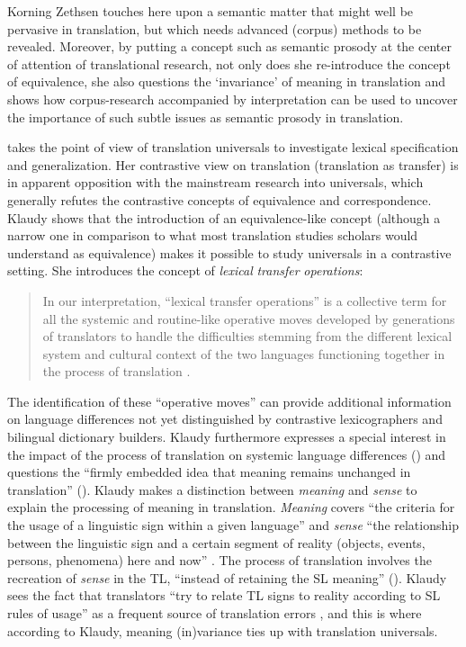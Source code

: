 Korning Zethsen touches here upon a semantic matter that might well be pervasive in translation, but which needs advanced (corpus) methods to be revealed. Moreover, by putting a concept such as semantic prosody at the center of attention of translational research, not only does she re-introduce the concept of equivalence, she also questions the ‘invariance’ of meaning in translation and shows how corpus-research accompanied by interpretation can be used to uncover the importance of such subtle issues as semantic prosody in translation.

\citet{lewandowska-tomasczyk_specification_2010} takes the point of view of translation universals to investigate lexical specification and generalization. Her contrastive view on translation (translation as transfer) is in apparent opposition with the mainstream research into universals, which generally refutes the contrastive concepts of equivalence and correspondence. Klaudy shows that the introduction of an equivalence-like concept (although a narrow one in comparison to what most translation studies scholars would understand as equivalence) makes it possible to study universals in a contrastive setting. She introduces the concept of \textit{lexical} \textit{transfer} \textit{operations}:

\begin{quote}
In our interpretation, “lexical transfer operations” is a collective term for all the systemic and routine-like operative moves developed by generations of translators to handle the difficulties stemming from the different lexical system and cultural context of the two languages functioning together in the process of translation \citep[81]{lewandowska-tomasczyk_specification_2010}.
\end{quote}

The identification of these “operative moves” can provide additional information on language differences not yet distinguished by contrastive lexicographers and bilingual dictionary builders. Klaudy furthermore expresses a special interest in the impact of the process of translation on systemic language differences (\citeyear[82]{lewandowska-tomasczyk_specification_2010}) and questions the “firmly embedded idea that meaning remains unchanged in translation” (\citeyear[82]{lewandowska-tomasczyk_specification_2010}). Klaudy makes a distinction between \textit{meaning} and \textit{sense} to explain the processing of meaning in translation. \textit{Meaning} covers “the criteria for the usage of a linguistic sign within a given language” and \textit{sense} “the relationship between the linguistic sign and a certain segment of reality (objects, events, persons, phenomena) here and now” \citep[83]{lewandowska-tomasczyk_specification_2010}. The process of translation involves the recreation of \textit{sense} in the TL, “instead of retaining the SL meaning” (\citeyear[83]{lewandowska-tomasczyk_specification_2010}). Klaudy sees the fact that translators “try to relate TL signs to reality according to SL rules of usage” as a frequent source of translation errors \citep[83]{lewandowska-tomasczyk_specification_2010}, and this is where according to Klaudy, meaning (in)variance ties up with translation universals.

